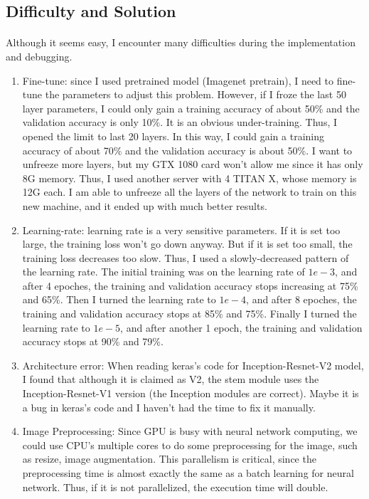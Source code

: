 \documentclass{gapd}
\begin{document}
\subsection{Difficulty and Solution}
\paragraph{}
	Although it seems easy, I encounter many difficulties during the implementation and debugging. 
	\begin{enumerate}
		\item Fine-tune: since I used pretrained model (Imagenet pretrain), I need to fine-tune the parameters to adjust this problem. However, if I froze the last 50 layer parameters, I could only gain a training accuracy of about 50\% and the validation accuracy is only 10\%. It is an obvious under-training. Thus, I opened the limit to last 20 layers. In this way, I could gain a training accuracy of about 70\% and the validation accuracy is about 50\%. I want to unfreeze more layers, but my GTX 1080 card won't allow me since it has only 8G memory. Thus, I used another server with 4 TITAN X, whose memory is 12G each. I am able to unfreeze all the layers of the network to train on this new machine, and it ended up with much better results. 
		\item Learning-rate: learning rate is a very sensitive parameters. If it is set too large, the training loss won't go down anyway. But if it is set too small, the training loss decreases too slow. Thus, I used a slowly-decreased pattern of the learning rate. The initial training was on the learning rate of $1e-3$, and after 4 epoches, the training and validation accuracy stops increasing at 75\% and 65\%. Then I turned the learning rate to $1e-4$, and after 8 epoches, the training and validation accuracy stops at 85\% and 75\%. Finally I turned the learning rate to $1e-5$, and after another 1 epoch, the training and validation accuracy stops at 90\% and 79\%. 
		\item Architecture error: When reading keras's code for Inception-Resnet-V2 model, I found that although it is claimed as V2, the stem module uses the Inception-Resnet-V1 version (the Inception modules are correct). Maybe it is a bug in keras's code and I haven't had the time to fix it manually. 
		\item Image Preprocessing: Since GPU is busy with neural network computing, we could use CPU's multiple cores to do some preprocessing for the image, such as resize, image augmentation. This parallelism is critical, since the preprocessing time is almost exactly the same as a batch learning for neural network. Thus, if it is not parallelized, the execution time will double. 
	\end{enumerate}
	
\end{document}
